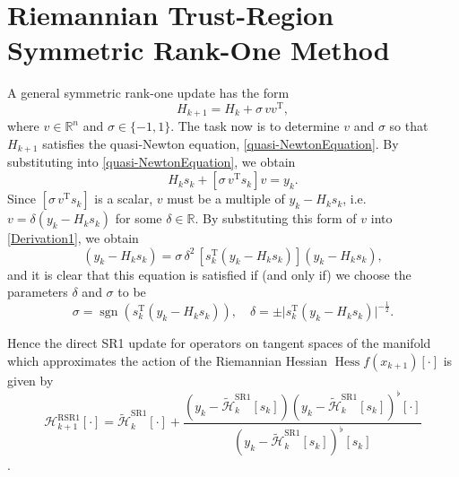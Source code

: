 \section{Riemannian Trust-Region Symmetric Rank-One Method}



A general symmetric rank-one update has the form
\begin{equation*}
    H_{k+1} = H_k + \sigma \, v v^{\mathrm{T}},
\end{equation*}
where $v \in \mathbb{R}^n$ and $\sigma \in \{-1,1\}$. The task now is to determine $v$ and $\sigma$ so that $H_{k+1}$ satisfies the quasi-Newton equation, \cref{quasi-NewtonEquation}. By substituting into \cref{quasi-NewtonEquation}, we obtain
\begin{equation}
    H_k s_k + [\sigma \, v^{\mathrm{T}} s_k] v = y_k.
\end{equation}
Since $[\sigma \, v^{\mathrm{T}} s_k]$ is a scalar, $v$ must be a multiple of $y_k − H_k s_k$, i.e. $v = \delta (y_k − H_k s_k)$ for some $\delta \in \mathbb{R}$. By substituting this form of $v$ into \cref{Derivation1}, we obtain
\begin{equation}
    (y_k − H_k s_k) = \sigma \, \delta^2 \, [s^{\mathrm{T}}_k (y_k − H_k s_k)](y_k − H_k s_k),
\end{equation}
and it is clear that this equation is satisfied if (and only if) we choose the parameters $\delta$ and $\sigma$ to be
\begin{equation*}
    \sigma = \operatorname{sgn} (s^{\mathrm{T}}_k (y_k − H_k s_k)), \quad \delta = \pm \lvert s^{\mathrm{T}}_k (y_k − H_k s_k) \rvert^{-\frac{1}{2}}.
\end{equation*}


Hence the direct SR1 update for operators on tangent spaces of the manifold which approximates the action of the Riemannian Hessian $\operatorname{Hess} f(x_{k+1}) [\cdot]$ is given by 
\begin{equation}\label{RiemannianDirectSR1formula}
    \mathcal{H}^\mathrm{RSR1}_{k+1} [\cdot] = \widetilde{\mathcal{H}}^\mathrm{SR1}_k [\cdot] + \frac{(y_k - \widetilde{\mathcal{H}}^\mathrm{SR1}_k [s_k]) (y_k - \widetilde{\mathcal{H}}^\mathrm{SR1}_k [s_k])^{\flat} [\cdot] }{(y_k - \widetilde{\mathcal{H}}^\mathrm{SR1}_k [s_k])^{\flat} [s_k]}
\end{equation}
\cite[p.~18]{Huang:2013}.




